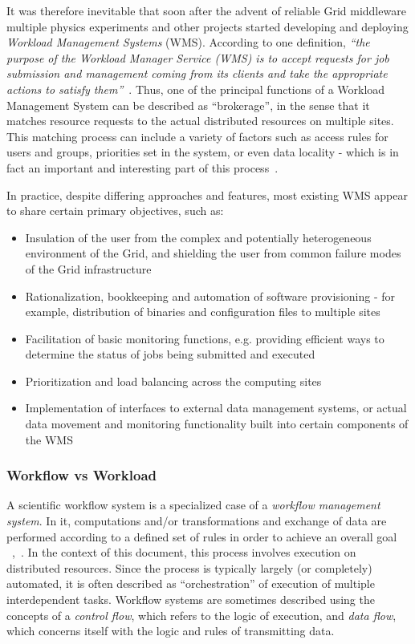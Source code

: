 It was therefore inevitable that soon after the advent of reliable Grid middleware multiple physics experiments and other projects started developing and deploying \textit{Workload Management Systems} (WMS).
 According to one definition,
\textit{``the purpose of the Workload Manager Service (WMS) is to accept requests for job submission and management coming from its clients and take the appropriate actions to satisfy them''}~\cite{egee_user_guide}.
Thus, one of the principal functions of a Workload Management System can be described as ``brokerage'', in the sense that it matches resource requests to the actual distributed resources
on multiple sites. This matching process can include a variety of factors such as access rules for users and groups, priorities set in the system, or even data locality - which is in fact an important and interesting part of this process~\cite{panda_chep10}.

In practice, despite differing approaches and features, most existing WMS appear to share certain primary objectives, such as:
\begin{itemize}
\item{Insulation of the user from the complex and potentially heterogeneous environment of the Grid, and shielding the user from common failure modes of the Grid infrastructure}
\item{Rationalization, bookkeeping and automation of software provisioning - for example, distribution of binaries and configuration files to multiple sites}
\item{Facilitation of basic monitoring functions, e.g. providing efficient ways to determine the status of jobs being submitted and executed}
\item{Prioritization and load balancing across the computing sites}
\item{Implementation of interfaces to external data management systems, or actual data movement and monitoring functionality built into certain components of the WMS}
\end{itemize}


\subsubsection{Workflow vs Workload}
\label{workflow_workload}
A scientific workflow system is a specialized case of a \textit{workflow management system}. In it, computations and/or transformations and exchange of data are performed according to a defined set of rules
in order to achieve an overall goal ~\cite{grid_workflow_taxonomy},~\cite{grid_workflow_fit}. In the context of this document, this process involves execution on distributed resources. Since the process is
typically largely (or completely) automated, it is often described as ``orchestration'' of execution of multiple interdependent tasks. Workflow systems are sometimes described using the concepts of a \textit{control flow},
which refers to the logic of execution, and \textit{data flow}, which concerns itself with the logic and rules of transmitting data.

